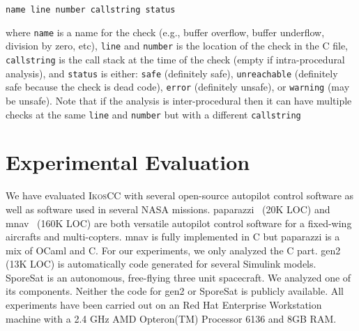 \documentclass[a4]{article}
\newcommand{\ikoscc}{\textsc{IkosCC}\xspace}
\begin{document}
\begin{small}
\begin{verbatim}
name line number callstring status
\end{verbatim}
\end{small}

\noindent where \texttt{name} is a name for the check (e.g., buffer
overflow, buffer underflow, division by zero, etc), \texttt{line} and
\texttt{number} is the location of the check in the C file,
\texttt{callstring} is the call stack at the time of the check (empty
if intra-procedural analysis), and \texttt{status} is either:
\texttt{safe} (definitely safe), \texttt{unreachable} (definitely safe
because the check is dead code), \texttt{error} (definitely unsafe),
or \texttt{warning} (may be unsafe).
% 
Note that if the analysis is inter-procedural then it can have
multiple checks at the same \texttt{line} and \texttt{number} but with
a different \texttt{callstring}


\section{Experimental Evaluation}
\label{sec:results}

We have evaluated \ikoscc with several open-source autopilot control
software as well as software used in several NASA missions.
%
\textsf{paparazzi}~\cite{paparazzi} (20K LOC) and
\textsf{mnav}~\cite{mnav} (160K LOC) are both versatile autopilot
control software for a fixed-wing aircrafts and
multi-copters. \textsf{mnav} is fully implemented in C but
\textsf{paparazzi} is a mix of OCaml and C. For our experiments, we
only analyzed the C part. \textsf{gen2} (13K LOC) is automatically
code generated for several Simulink models. \textsf{SporeSat} is an autonomous, free-flying three unit
spacecraft. We analyzed one of its components. Neither the code for \textsf{gen2} or \textsf{SporeSat} is
publicly available.
%
All experiments have been carried out on an Red Hat Enterprise
Workstation machine with a 2.4 GHz AMD Opteron(TM) Processor 6136
and 8GB RAM.
\end{document}
